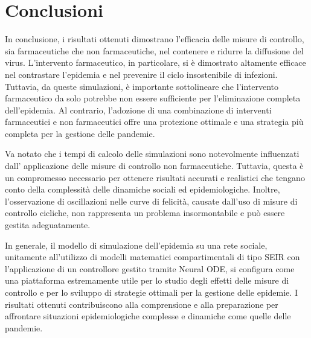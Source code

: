 \section{Conclusioni}

In conclusione, i risultati ottenuti dimostrano  
l'efficacia delle misure di controllo, sia farmaceutiche che non 
farmaceutiche, nel contenere e ridurre la diffusione del virus. 
L'intervento farmaceutico, in particolare, si è dimostrato altamente 
efficace nel contrastare l'epidemia e nel prevenire il ciclo 
insostenibile di infezioni. Tuttavia, da queste simulazioni, è importante sottolineare che 
l'intervento farmaceutico da solo potrebbe non essere sufficiente per 
l'eliminazione completa dell'epidemia. Al contrario, l'adozione di una 
combinazione di interventi farmaceutici e non farmaceutici offre una 
protezione ottimale e una strategia più completa per la gestione delle 
pandemie.

Va notato che i tempi di calcolo delle simulazioni sono notevolmente 
influenzati dall' applicazione delle misure di controllo non farmaceutiche. 
Tuttavia, questa è un compromesso necessario per ottenere risultati 
accurati e realistici che tengano conto della complessità delle dinamiche 
sociali ed epidemiologiche. Inoltre, l'osservazione di oscillazioni 
nelle curve di felicità, causate dall'uso di misure di controllo cicliche, 
non rappresenta un problema insormontabile e può essere gestita 
adeguatamente.

In generale, il modello di simulazione dell'epidemia su una rete sociale,
unitamente all'utilizzo di modelli matematici compartimentali di tipo SEIR
con l'applicazione di un controllore gestito tramite Neural ODE, 
si configura come una piattaforma estremamente utile per lo studio degli 
effetti delle misure di controllo e per lo sviluppo di strategie ottimali 
per la gestione delle epidemie. I risultati ottenuti contribuiscono alla 
comprensione e alla preparazione per affrontare situazioni 
epidemiologiche complesse e dinamiche come quelle delle pandemie.